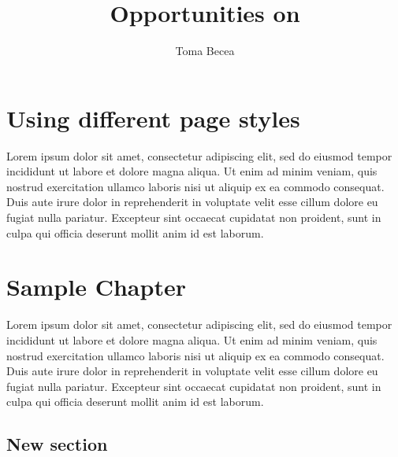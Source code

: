 \documentclass[a4paper,12pt,twoside]{book}
\title{Opportunities on }
\author{Toma Becea}
\begin{document}
\maketitle

\chapter{Using different page styles}

Lorem ipsum dolor sit amet, consectetur adipiscing elit, sed do eiusmod tempor incididunt ut labore et dolore magna aliqua. Ut enim ad minim veniam, quis nostrud exercitation ullamco laboris nisi ut aliquip ex ea commodo consequat. Duis aute irure dolor in reprehenderit in voluptate velit esse cillum dolore eu fugiat nulla pariatur. Excepteur sint occaecat cupidatat non proident, sunt in culpa qui officia deserunt mollit anim id est laborum.


\chapter{Sample Chapter}
\thispagestyle{empty}

Lorem ipsum dolor sit amet, consectetur adipiscing elit, sed do eiusmod tempor incididunt ut labore et dolore magna aliqua. Ut enim ad minim veniam, quis nostrud exercitation ullamco laboris nisi ut aliquip ex ea commodo consequat. Duis aute irure dolor in reprehenderit in voluptate velit esse cillum dolore eu fugiat nulla pariatur. Excepteur sint occaecat cupidatat non proident, sunt in culpa qui officia deserunt mollit anim id est laborum.

\clearpage

\section{New section}

\Blindtext
\end{document}

